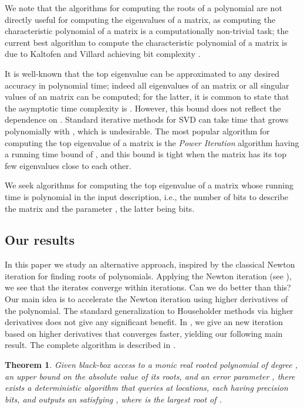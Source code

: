 \documentclass{article}[12pt]
\newtheorem{theorem}{Theorem}[section]
\theoremstyle{definition}
\begin{document}
We note that the algorithms for computing the roots of a polynomial are not directly useful 
for computing the eigenvalues of a matrix, as
computing the characteristic polynomial of a matrix is a computationally non-trivial task; 
the current best algorithm to compute the characteristic polynomial of a matrix 
is due to Kaltofen and Villard \cite{kv05b} achieving bit complexity . 


It is well-known that the top eigenvalue can be approximated to any desired accuracy 
 in polynomial time; indeed all  eigenvalues of an  matrix or all singular values 
of an  matrix can be 
computed; for the latter, it is common to state that the asymptotic 
time complexity is . However, this 
bound does not reflect the dependence on . Standard iterative methods for SVD 
can take time that grows polynomially with , which is undesirable.
The most popular algorithm for computing the top eigenvalue of a matrix is the 
{\em Power Iteration} algorithm \cite{mp29} having a running time
bound of , and this bound is tight when the matrix has its top few 
eigenvalues close to each other.


We seek algorithms for computing the top eigenvalue of a matrix whose running time is polynomial  
in the input description, i.e., the number of bits to describe the matrix  and 
the parameter , the latter being  bits.


\subsection{Our results}
In this paper
 we study an alternative approach, inspired by the classical Newton iteration for finding roots of polynomials. 
Applying the Newton iteration (see ), we see that the iterates converge 
within  iterations.  
Can we do better than this? Our main idea is to accelerate the Newton iteration using higher derivatives 
of the polynomial. The standard generalization 
to Householder methods via higher derivatives \cite{h70,or70} does not give any significant benefit. In , 
we give an new iteration based on higher derivatives that converges faster, 
yielding our following main result.
The complete algorithm is described in .
\begin{theorem}
\label{thm:poly-blackbox}
Given black-box access to a monic real rooted polynomial  of degree , an upper bound  
on the absolute value of its roots,
and an error parameter , there exists a deterministic algorithm that queries 
at  locations, 
each having precision  bits, 
and outputs an  satisfying
,
where  is the largest root of . 
\end{theorem}
\end{document}
